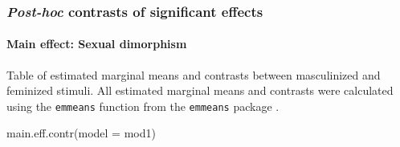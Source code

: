 \documentclass[
  bookmarksnumbered]{article}
\newenvironment{Shaded}{\begin{snugshade}}{\end{snugshade}}
\newcommand{\AttributeTok}[1]{\textcolor[rgb]{0.80,0.80,0.80}{#1}}
\newcommand{\FunctionTok}[1]{\textcolor[rgb]{0.94,0.94,0.56}{#1}}
\newcommand{\NormalTok}[1]{\textcolor[rgb]{0.80,0.80,0.80}{#1}}
\begin{document}
\subsubsection{\texorpdfstring{\emph{Post-hoc} contrasts of significant effects}{Post-hoc contrasts of significant effects}}\label{post-hoc-contrasts-of-significant-effects}

\paragraph{Main effect: Sexual dimorphism}\label{main-effect-sexual-dimorphism}

Table of estimated marginal means and contrasts between masculinized and feminized stimuli. All estimated marginal means and contrasts were calculated using the \texttt{emmeans} function from the \texttt{emmeans} package \autocite{emmeanscit}.

\begin{Shaded}
\begin{Highlighting}[]
\FunctionTok{main.eff.contr}\NormalTok{(}\AttributeTok{model =}\NormalTok{ mod1)}
\end{Highlighting}
\end{Shaded}

\begin{table}[H]
\centering
\caption{\label{tab:unnamed-chunk-33}Estimated marginal and constrast between masculinized and feminized 
                           stimuli for the DFF model}
\centering
{}
\end{table}
\end{document}
